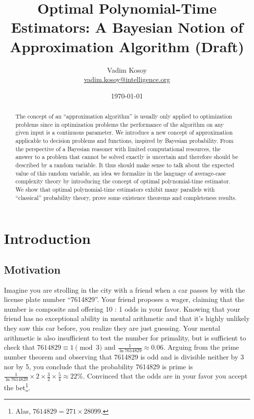 \documentclass{article}
\numberwithin{equation}{section}
\theoremstyle{definition}
\theoremstyle{plain}
\begin{document}
\title{Optimal Polynomial-Time Estimators: A Bayesian Notion of Approximation Algorithm (Draft)}

\author{Vadim Kosoy \\ \href{mailto:vadim.kosoy@intelligence.org}{vadim.kosoy@intelligence.org}}

\date{\today}

\maketitle

\begin{abstract}
The concept of an \enquote{approximation algorithm} is usually only applied to optimization problems since in optimization problems the performance of the algorithm on any given input is a continuous parameter. We introduce a new concept of approximation applicable to decision problems and functions, inspired by Bayesian probability. From the perspective of a Bayesian reasoner with limited computational resources, the answer to a problem that cannot be solved exactly is uncertain and therefore should be described by a random variable. It thus should make sense to talk about the expected value of this random variable, an idea we formalize in the language of average-case complexity theory by introducing the concept of optimal polynomial-time estimator. We show that optimal polynomial-time estimators exhibit many parallels with \enquote{classical} probability theory, prove some existence theorems and completeness results.%
\end{abstract}%

\setcounter{section}{-1}

\section{Introduction}

\subsection{Motivation}
\label{subsec:mot}

Imagine you are strolling in the city with a friend when a car passes by with the license plate number \enquote{7614829}. Your friend proposes a wager, claiming that the number is composite and offering 10 : 1 odds in your favor. Knowing that your friend has no exceptional ability in mental arithmetic and that it's highly unlikely they saw this car before, you realize they are just guessing. Your mental arithmetic is also insufficient to test the number for primality, but is sufficient to check that ${7614829 \equiv 1 \pmod{3}}$ and $\frac{1}{\ln 7614829} \approx 0.06$. Arguing from the prime number theorem and observing that 7614829 is odd and is divisible neither by 3 nor by 5, you conclude that the probability 7614829 is prime is ${\frac{1}{\ln 7614829} \times 2 \times \frac{3}{2} \times \frac{5}{4} \approx 22\%}$. Convinced that the odds are in your favor you accept the bet\footnote{Alas, $7614829 = 271 \times 28099$.}.
\end{document}
